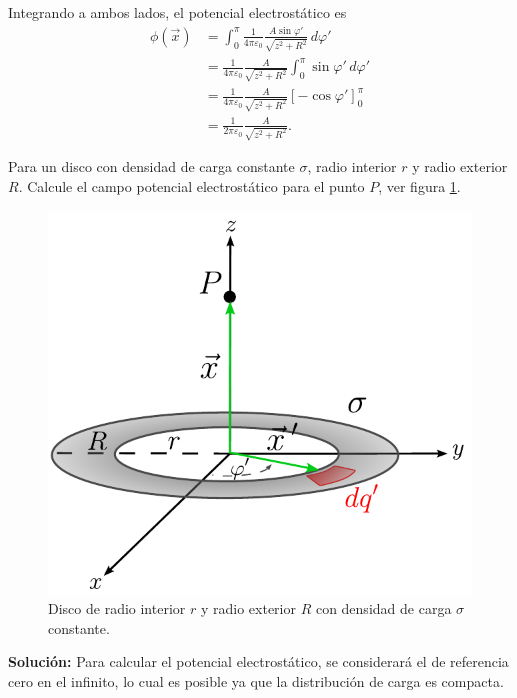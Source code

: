 \begin{ejemplo}
Integrando a ambos lados, el potencial electrostático es
\begin{align*}
    \phi(\Vec{x}) &= \int_0^{\pi} \frac{1}{4\pi\varepsilon_0} \frac{A\sin\varphi'}{\sqrt{z^2 + R^2}} \,d\varphi' \\
    &= \frac{1}{4\pi \varepsilon_0} \frac{A}{\sqrt{z^2+R^2}} \int_0^{\pi} \sin \varphi' \,d\varphi' \\
    &= \frac{1}{4\pi \varepsilon_0} \frac{A}{\sqrt{z^2+R^2}} [-\cos\varphi']_0^{\pi} \\
    &=  \frac{1}{2\pi \varepsilon_0} \frac{A}{\sqrt{z^2+R^2}}.
\end{align*}

\end{ejemplo}

\begin{ejemplo} \label{Potencial-Disco}
   Para un disco con densidad de carga constante $\sigma$, radio interior $r$ y radio exterior $R$. Calcule el campo potencial electrostático para el punto $P$, ver figura \ref{fig:Ej-Potencial-2}.

\begin{figure}[H]
    \centering
    \includegraphics[scale = 0.65]{Figuras/Ej-Potencial-2.pdf}
    \caption{Disco de radio interior $r$ y radio exterior $R$ con densidad de carga $\sigma$ constante.}
    \label{fig:Ej-Potencial-2}
\end{figure}

\textbf{Solución:} Para calcular el potencial electrostático, se considerará el de referencia cero en el infinito, lo cual es posible ya que la distribución de carga es compacta.


\end{ejemplo}
